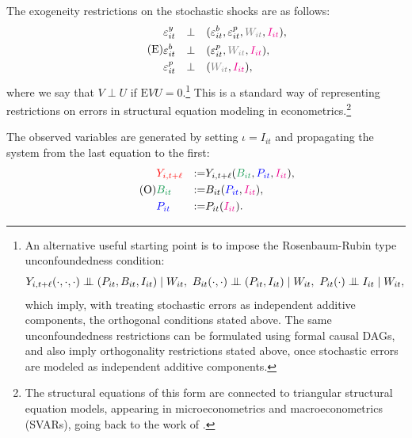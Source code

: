 \documentclass[11pt,reqno,letter]{amsart}
\theoremstyle{definition}
\newcommand\indep{\protect\mathpalette{\protect\independenT}{\perp}}
\def\independenT#1#2{\mathrel{\setbox0\hbox{$#1#2$}%
    \copy0\kern-\wd0\mkern4mu\box0}}
\newcommand{\Ep}{{\mathrm{E}}}
\def\bcolor{\color{ForestGreen}}
\def\pcolor{\color{blue}}
\def\icolor{\color{magenta}}
\def\wcolor{\color{gray}}
\def\ycolor{\color{red}}
\begin{document}
The exogeneity restrictions on the stochastic shocks are as follows:
\begin{equation}\label{eqn:SEM2} \tag{E}
\begin{aligned}
   & \varepsilon^y_{it} &  \perp &  \quad (\varepsilon^b_{it}, \varepsilon^p_{it}, {\wcolor W_{it}}, {\icolor I_{it}}), \\
&  \varepsilon^b_{it}  & \perp & \quad  (\varepsilon^p_{it}, {\wcolor W_{it}}, {\icolor I_{it}}), \\
&   \varepsilon^p_{it} &  \perp &  \quad ({\wcolor W_{it}}, {\icolor I_{it}}),
\end{aligned}
\end{equation}
where we say that $V \perp U$ if $\Ep VU = 0$.\footnote{ An alternative useful
starting point is to impose the Rosenbaum-Rubin type unconfoundedness condition:
$$
Y_{i,t+\ell} (\cdot,\cdot,\cdot)  \indep (P_{it}, B_{it}, I_{it})  \mid W_{it}, \
B_{it} (\cdot,\cdot)  \indep (P_{it}, I_{it})  \mid W_{it}, \
 P_{it} (\cdot)  \indep  I_{it}  \mid W_{it},
$$
which imply, with treating stochastic errors as independent additive components, the orthogonal conditions stated above.
The same unconfoundedness restrictions can be formulated using formal causal DAGs, and also imply orthogonality restrictions stated above, once stochastic errors are modeled as independent additive components.} This is a standard way of representing restrictions on errors in structural equation modeling in econometrics.\footnote{The structural equations of this form are connected to triangular structural equation models, appearing in microeconometrics and macroeconometrics (SVARs), going back to the work of  \cite{strotz1960recursive}.}


The observed variables are generated by setting $\iota = I_{it}$ and propagating
the system from the last equation to the first:
\begin{equation} \label{eqn:SEMO}\tag{O}
\begin{aligned}
& {\ycolor Y_{i,t+\ell}}  & := & Y_{i,t+\ell} ( {\bcolor B_{it} } ,{\pcolor P_{it}}, {\icolor I_{it}}), \\
& {\bcolor B_{it} } & := &   B_{it}({\pcolor P_{it} } ,{\icolor I_{it}}), \\
& {\pcolor P_{it} }& := &  P_{it}({\icolor I_{it}}). \end{aligned}
\end{equation}
\end{document}
